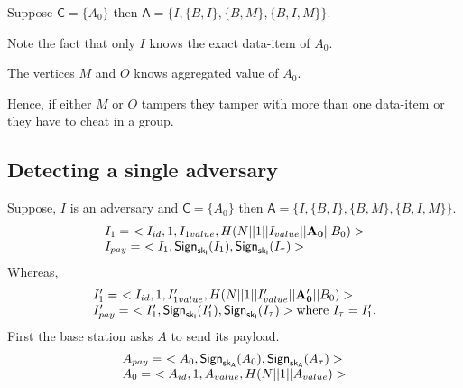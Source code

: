 \documentclass[%
  slidesonly,%
  semlayer%
  ]{seminar}                                  %
\newcommand{\sk}{\sf{sk}}
\begin{document}
\begin{slide}
        Suppose $\textsf{C}=\{A_{0}\}$ then $\textsf{A} =\{I,\{B,I\},\{B,M\},\{B,I,M\}\}$. 

        Note the fact that only $I$ knows the exact data-item of $A_{0}$. 
        
        The vertices $M$ and $O$ knows aggregated value of $A_{0}$. 
        
        Hence, if either $M$ or $O$ tampers they tamper with more than one data-item or they have to cheat in a group. 

    \subsection*{Detecting a single adversary}
        \vfill
        Suppose, $I$ is an adversary and $\textsf{C} = \{A_{0}\}$ then $\textsf{A}=\{I,\{B,I\},\{B,M\},\{B,I,M\}\}$.
        \begin{equation*}
          \begin{array}{l}
            I_{1} =\ <I_{id}, 1, I_{1value}, H(N||1||I_{value}||\mathbf{A_{0}}||B_{0})> \\ 
            I_{pay} =\ <I_{1}, \textsf{Sign}_{\sk_{I}}(I_{1}), \textsf{Sign}_{\sk_{I}}(I_{\tau})>\\
          \end{array}
        \end{equation*}
        Whereas,
        \begin{equation*}
          \begin{array}{l}
            I'_{1} =\ <I_{id}, 1, I'_{1value}, H(N||1||I'_{value}||\mathbf{A'_{0}}||B_{0})> \\
            I'_{pay} =\ <I'_{1}, \textsf{Sign}_{\sk_{I}}(I'_{1}), \textsf{Sign}_{\sk_{I}}(I_{\tau})> \mbox{where}\ I_{\tau} = I'_{1}.\\
          \end{array}
        \end{equation*}
        First the base station asks $A$ to send its payload.
        \begin{equation*}
          \begin{array}{l}
          A_{pay} =\ <A_{0}, \textsf{Sign}_{\sk_{A}}(A_{0}), \textsf{Sign}_{\sk_{A}}(A_{\tau})>\\
          A_{0} =\ <A_{id}, 1, A_{value}, H(N||1||A_{value})>
          \end{array}
        \end{equation*}


\end{slide}
\end{document}
